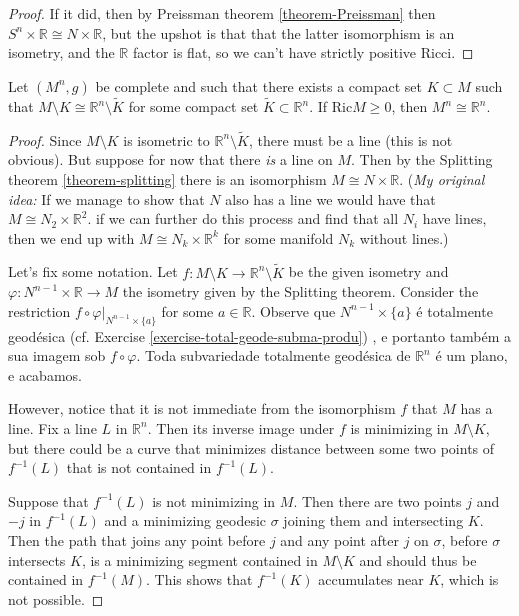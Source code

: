 \begin{proof}
If it did, then by Preissman theorem
\ref{theorem-Preissman} then $S^n\times
\mathbb{R}\cong N \times \mathbb{R}$, but the
upshot is that that the latter
isomorphism is an isometry, and the
$\mathbb{R}$ factor is flat, so we can't
have strictly positive Ricci.
\end{proof}

\begin{exercise}
\label{exercise-compl-witho-compa-set-isom}
Let $(M^n,g)$ be complete and such that there
exists a compact set
 $K\subset M$ such that $M\setminus K \cong
 \mathbb{R}^n \setminus \tilde{K}$
for some compact set $\tilde{K} \subset
\mathbb{R}^n$. If $\text{Ric}M \geq 0$,
then $M^n \cong \mathbb{R}^n$.
\end{exercise}

\begin{proof}
Since $M\setminus K$ is isometric to
$\mathbb{R}^n\setminus \tilde{K}$, there
must be a line (this is not obvious).
But suppose for now that there {\it
is} a line on $M$. Then by the Splitting
theorem \ref{theorem-splitting} there
is an isomorphism $M \cong N \times
\mathbb{R}$. ({\it My original idea:}
 If we manage to show that $N$ also has a
 line we would have that
 $M \cong N_2 \times \mathbb{R}^2$.  if we
 can further do this process and find
 that all $N_i$ have lines,
then we end up with $M \cong N_k \times
\mathbb{R}^k$ for some manifold $N_k$
without lines.)

Let's fix some notation. Let
$f:M\setminus K \to \mathbb{R}^n
\setminus\tilde{K}$ be the given isometry and
$\varphi:N^{n-1}\times\mathbb{R} \to M$ the
isometry given by the Splitting
theorem. Consider the restriction $f \circ
\varphi |_{ N^{n-1}\times \{ a\}}$
for some $a \in \mathbb{R}$. Observe que
$N^{n-1}\times \{ a\}$ é totalmente
geodésica (cf. Exercise
\ref{exercise-total-geode-subma-produ})
, e portanto também a sua imagem sob  $f
\circ \varphi$. Toda subvariedade
totalmente geodésica de $\mathbb{R}^n$ é um
plano, e acabamos.

However, notice that it is not immediate from
the
isomorphism $f$ that $M$ has a line. Fix a
line $L$ in $\mathbb{R}^n$. Then its
inverse image under $f$ is minimizing in $M
\setminus K$, but there could be a
curve that minimizes distance between some
two points of $f^{-1}(L)$ that is not
contained in $f^{-1}(L)$.

Suppose that $f^{-1}(L)$ is not minimizing in
$M$. Then there are two points $j$
and $-j$ in $f^{-1}(L)$ and a minimizing
geodesic $\sigma$ joining them and
intersecting $K$. Then the path that joins
any point before $j$ and any point
after $j$ on $\sigma$, before $\sigma$
intersects $K$, is a minimizing segment
contained in $M\setminus K$ and should thus
be contained in $f^{-1}(M)$. This
shows that $f^{-1}(K)$ accumulates near $K$,
which is not possible.
\end{proof}

